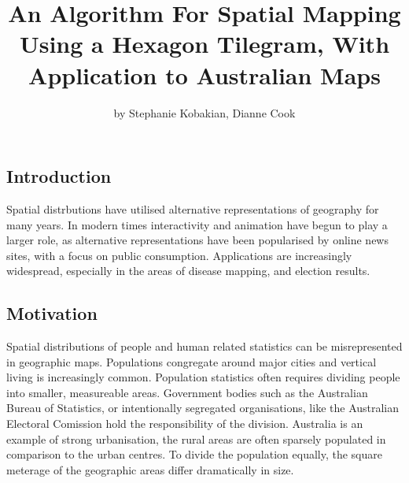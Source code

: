 \title{An Algorithm For Spatial Mapping Using a Hexagon Tilegram, With
Application to Australian Maps}
\author{by Stephanie Kobakian, Dianne Cook}

\maketitle



\hypertarget{introduction}{%
\subsection{Introduction}\label{introduction}}

Spatial distrbutions have utilised alternative representations of
geography for many years. In modern times interactivity and animation
have begun to play a larger role, as alternative representations have
been popularised by online news sites, with a focus on public
consumption. Applications are increasingly widespread, especially in the
areas of disease mapping, and election results.

\hypertarget{motivation}{%
\subsection{Motivation}\label{motivation}}

Spatial distributions of people and human related statistics can be
misrepresented in geographic maps. Populations congregate around major
cities and vertical living is increasingly common. Population statistics
often requires dividing people into smaller, measureable areas.
Government bodies such as the Australian Bureau of Statistics, or
intentionally segregated organisations, like the Australian Electoral
Comission hold the responsibility of the division. Australia is an
example of strong urbanisation, the rural areas are often sparsely
populated in comparison to the urban centres. To divide the population
equally, the square meterage of the geographic areas differ dramatically
in size.


